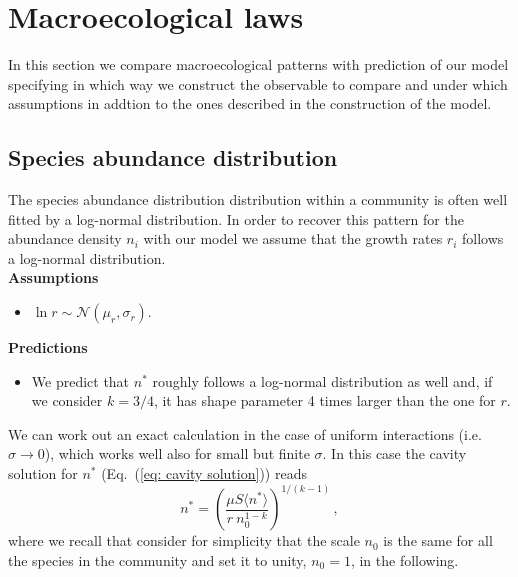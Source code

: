 \documentclass[10pt]{article}
\begin{document}
\section{Macroecological laws}
In this section we compare macroecological patterns
with prediction of our model specifying in which way
we construct the observable to compare and under which assumptions
in addtion to the ones described in the construction of the model.

\subsection{Species abundance distribution}
The species abundance distribution distribution within a community
is often well fitted by a log-normal distribution.
In order to recover this pattern for the abundance density $n_i$ 
with our model we assume that
the growth rates $r_i$ follows a log-normal distribution.
\\

\textbf{Assumptions}
\begin{itemize}
    \item $\ln r\sim\mathcal{N} (\mu_r,\sigma_r)$.
\end{itemize}

\textbf{Predictions}
\begin{itemize}
    \item We predict that $n^*$ roughly follows a 
    log-normal distribution as well and, if we consider $k=3/4$,
    it has shape parameter 4 times larger than the one for $r$.
\end{itemize}

We can work out an exact calculation in the case of uniform interactions (i.e. $\sigma\to0$),
which works well also for small but finite $\sigma$.
In this case the cavity solution for $n^*$ (Eq.~(\ref{eq: cavity solution})) reads
\begin{equation}
    n^* = \left(\frac{\mu S \langle n^* \rangle}
    {r \ n_0^{1-k}}\right)^{1/(k-1)} \, ,
\end{equation}
where we recall that consider for simplicity that the scale $n_0$ is the same for all the species in
the community and set it to unity, $n_0=1$, in the following.
\end{document}
